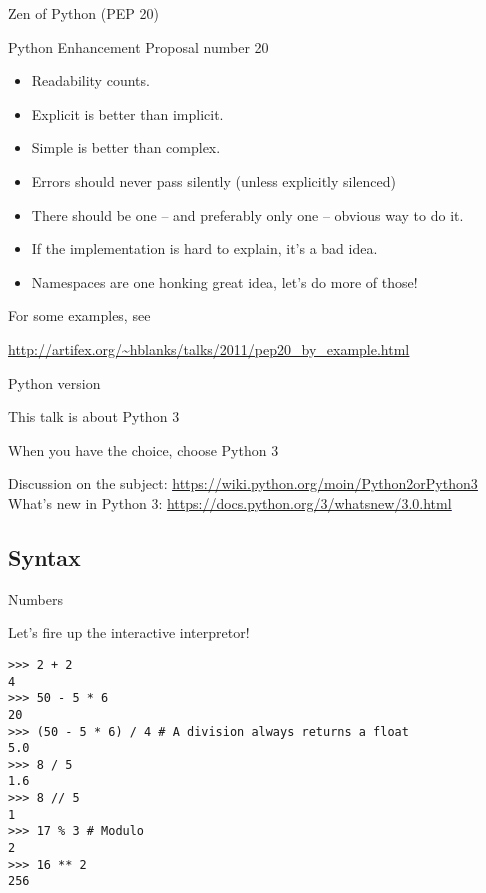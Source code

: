 \documentclass[ignorenonframetext,]{beamer}
\newcommand{\myurl}[1]{\textcolor{blue}{\underline{\url{#1}}}}
\begin{document}
\begin{frame}{Zen of Python (PEP 20)}

    Python Enhancement Proposal number 20

    \begin{itemize}[<+-| alert@+>]
        \item Readability counts.
        \item Explicit is better than implicit.
        \item Simple is better than complex.
        \item Errors should never pass silently (unless explicitly silenced)
        \item There should be one -- and preferably only one -- obvious way to do it.
        \item If the implementation is hard to explain, it's a bad idea.
        \item Namespaces are one honking great idea, let's do more of those!
    \end{itemize}
\end{frame}

\begin{frame}%

    For some examples, see

    \myurl{http://artifex.org/~hblanks/talks/2011/pep20_by_example.html}

\end{frame}

\begin{frame}{Python version}

    This talk is about {\LARGE Python} {\Huge 3}

    When you have the choice, choose Python 3

    Discussion on the subject: \myurl{https://wiki.python.org/moin/Python2orPython3}\\

    What's new in Python 3: \myurl{https://docs.python.org/3/whatsnew/3.0.html}

\end{frame}

\subsection{Syntax}

\begin{frame}[fragile]{Numbers}

    Let's fire up the interactive interpretor!

    \begin{tcolorbox}
    \begin{verbatim}
>>> 2 + 2
4
>>> 50 - 5 * 6
20
>>> (50 - 5 * 6) / 4 # A division always returns a float
5.0
>>> 8 / 5
1.6
>>> 8 // 5
1
>>> 17 % 3 # Modulo
2
>>> 16 ** 2
256
    \end{verbatim}
    \end{tcolorbox}
\end{frame}
\end{document}
